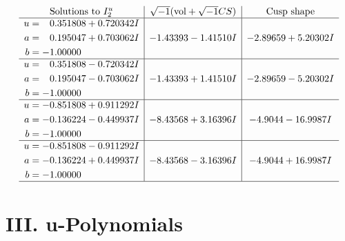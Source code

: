 \documentclass[1p]{elsarticle_modified}
\theoremstyle{definition}
\newcommand{\I}{\sqrt{-1}}
\begin{document}
$$\begin{array}{c|c|c}  
\text{Solutions to }I^u_{2}& \I (\text{vol} + \sqrt{-1}CS) & \text{Cusp shape}\\
 \hline 
\begin{aligned}
u &= \phantom{-}0.351808 + 0.720342 I \\
a &= \phantom{-}0.195047 + 0.703062 I \\
b &= -1.00000\phantom{ +0.000000I}\end{aligned}
 & -1.43393 - 1.41510 I & -2.89659 + 5.20302 I \\ \hline\begin{aligned}
u &= \phantom{-}0.351808 - 0.720342 I \\
a &= \phantom{-}0.195047 - 0.703062 I \\
b &= -1.00000\phantom{ +0.000000I}\end{aligned}
 & -1.43393 + 1.41510 I & -2.89659 - 5.20302 I \\ \hline\begin{aligned}
u &= -0.851808 + 0.911292 I \\
a &= -0.136224 - 0.449937 I \\
b &= -1.00000\phantom{ +0.000000I}\end{aligned}
 & -8.43568 + 3.16396 I & -4.9044 - 16.9987 I \\ \hline\begin{aligned}
u &= -0.851808 - 0.911292 I \\
a &= -0.136224 + 0.449937 I \\
b &= -1.00000\phantom{ +0.000000I}\end{aligned}
 & -8.43568 - 3.16396 I & -4.9044 + 16.9987 I\\
 \hline 
 \end{array}$$\newpage
\newpage\renewcommand{\arraystretch}{1}
\centering \section*{ III. u-Polynomials}
\end{document}
